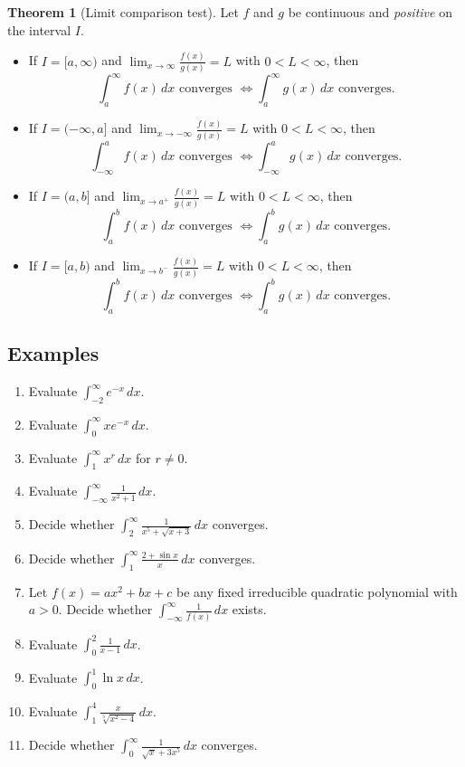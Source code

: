 \documentclass[11pt]{article}
\theoremstyle{definition}
\theoremstyle{named}
\newtheorem*{namedtheorem}{Theorem}
\numberwithin{myalgctr}{section}
\begin{document}
\begin{namedtheorem}[Limit comparison test] Let $f$ and $g$ be continuous and {\em positive} on the interval $I$.
  \begin{itemize}
    \item If $I=[a,\infty)$ and $\displaystyle\lim_{x\to\infty}\frac{f(x)}{g(x)}=L$ with $0< L <\infty$, then
    \[
    \int_a^\infty f(x)\, dx \text{ converges }\iff \int_a^\infty g(x)\, dx \text{ converges}.
    \]
    \item If $I=(-\infty,a]$ and $\displaystyle\lim_{x\to-\infty}\frac{f(x)}{g(x)}=L$ with $0< L <\infty$, then
    \[
    \int_{-\infty}^a f(x)\, dx \text{ converges }\iff \int_{-\infty}^a g(x)\, dx \text{ converges}.
    \]
    \item If $I=(a,b]$ and $\displaystyle\lim_{x\to a^+}\frac{f(x)}{g(x)}=L$ with $0< L <\infty$, then
    \[
    \int_{a}^b f(x)\, dx \text{ converges }\iff \int_a^b g(x)\, dx \text{ converges}.
    \]
    \item If $I=[a,b)$ and $\displaystyle\lim_{x\to b^-}\frac{f(x)}{g(x)}=L$ with $0< L <\infty$, then
    \[
    \int_{a}^b f(x)\, dx \text{ converges }\iff \int_a^b g(x)\, dx \text{ converges}.
    \]
  \end{itemize}
\end{namedtheorem}




\subsection*{Examples}
\begin{enumerate}
  \item Evaluate $\displaystyle\int_{-2}^{\infty}e^{-x}\, dx$.
  \item Evaluate $\displaystyle\int_{0}^\infty xe^{-x}\, dx$.
  \item Evaluate $\displaystyle\int_{1}^\infty x^{r}\, dx$ for $r\ne 0$.
  \item Evaluate $\displaystyle\int_{-\infty}^{\infty}\frac{1}{x^2+1}\, dx$.
  \item Decide whether $\displaystyle\int_2^\infty \frac{1}{x^5+\sqrt{x+3}}\, dx$ converges.
  \item Decide whether $\displaystyle\int_1^\infty \frac{2+\sin x}{x}\, dx$ converges.
  \item Let $f(x)=ax^2+bx+c$ be any fixed irreducible quadratic polynomial with $a>0$. Decide whether $\displaystyle\int_{-\infty}^\infty \frac{1}{f(x)}\, dx$ exists.
  \item Evaluate $\displaystyle\int_{0}^2\frac{1}{x-1}\, dx$.
  \item Evaluate $\displaystyle\int_0^{1}\ln x\, dx$.
  \item Evaluate $\displaystyle\int_1^{4}\frac{x}{\sqrt[3]{x^2-4}}\, dx$.
  \item Decide whether $\displaystyle\int_0^\infty\frac{1}{\sqrt{x}+3x^5}\, dx$ converges.
\end{enumerate}
\end{document}
